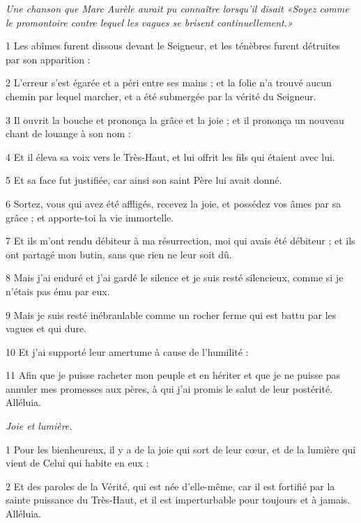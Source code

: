 
\par \textit{Une chanson que Marc Aurèle aurait pu connaître lorsqu'il disait «Soyez comme le promontoire contre lequel les vagues se brisent continuellement.»}

\par 1 Les abîmes furent dissous devant le Seigneur, et les ténèbres furent détruites par son apparition :
\par 2 L'erreur s'est égarée et a péri entre ses mains ; et la folie n'a trouvé aucun chemin par lequel marcher, et a été submergée par la vérité du Seigneur.
\par 3 Il ouvrit la bouche et prononça la grâce et la joie ; et il prononça un nouveau chant de louange à son nom :
\par 4 Et il éleva sa voix vers le Très-Haut, et lui offrit les fils qui étaient avec lui.
\par 5 Et sa face fut justifiée, car ainsi son saint Père lui avait donné.
\par 6 Sortez, vous qui avez été affligés, recevez la joie, et possédez vos âmes par sa grâce ; et apporte-toi la vie immortelle.
\par 7 Et ils m'ont rendu débiteur à ma résurrection, moi qui avais été débiteur ; et ils ont partagé mon butin, sans que rien ne leur soit dû.
\par 8 Mais j'ai enduré et j'ai gardé le silence et je suis resté silencieux, comme si je n'étais pas ému par eux.
\par 9 Mais je suis resté inébranlable comme un rocher ferme qui est battu par les vagues et qui dure.
\par 10 Et j'ai supporté leur amertume à cause de l'humilité :
\par 11 Afin que je puisse racheter mon peuple et en hériter et que je ne puisse pas annuler mes promesses aux pères, à qui j'ai promis le salut de leur postérité. Alléluia.


\par \textit{Joie et lumière.}

\par 1 Pour les bienheureux, il y a de la joie qui sort de leur cœur, et de la lumière qui vient de Celui qui habite en eux :
\par 2 Et des paroles de la Vérité, qui est née d'elle-même, car il est fortifié par la sainte puissance du Très-Haut, et il est imperturbable pour toujours et à jamais. Alléluia.

